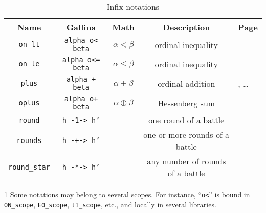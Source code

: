 \documentclass[a4paper]{book}
\begin{document}
\vspace{4pt}
\begin{table}[H]
  \centering
  \begin{threeparttable}
    \caption{Infix notations}
\begin{tabular}{|c|c|c|c|l|}
\hline
Name & Gallina&Math& Description& Page \\\hline
 \texttt{on\_lt} & \texttt{alpha o< beta}&$\alpha<\beta$& ordinal inequality \tnote{1} & \pageref{sect:on-lt-notation}\\
 \texttt{on\_le} & \texttt{alpha o<= beta}&$\alpha\leq\beta$& ordinal inequality & \pageref{sect:on-lt-notation}\\
\texttt{plus} & \texttt{alpha + beta} & $\alpha + \beta$ & ordinal addition & \pageref{sect:infix-plus-T1}, \dots\\
\texttt{oplus} & \texttt{alpha o+ beta} & $\alpha \oplus \beta$ & Hessenberg sum & \pageref{sect:infix-oplus} \\
\texttt{round} & \texttt{h -1-> h'} & & one round of a battle & \pageref{sect:infix-round} \\
\texttt{rounds} & \texttt{h -+-> h'} & & one or more  rounds of a battle & \pageref{sect:infix-rounds} \\
\texttt{round\_star} & \texttt{h -*-> h'} & & any number of rounds of a battle & \pageref{sect:infix-rounds} \\

\hline
\end{tabular}

\begin{tablenotes}
 \item [1]
Some notations may belong to several scopes. For instance, ``\texttt{o<}'' is
bound in \texttt{ON\_scope}, \texttt{E0\_scope}, \texttt{t1\_scope}, etc., and locally in several libraries.
\end{tablenotes}
\end{threeparttable}
\end{table}
\end{document}
